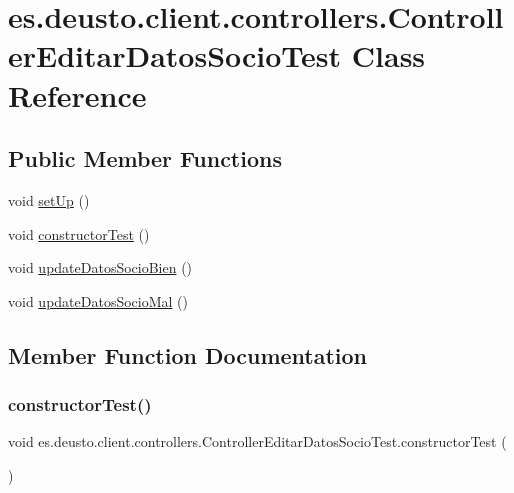 \hypertarget{classes_1_1deusto_1_1client_1_1controllers_1_1_controller_editar_datos_socio_test}{}\section{es.\+deusto.\+client.\+controllers.\+Controller\+Editar\+Datos\+Socio\+Test Class Reference}
\label{classes_1_1deusto_1_1client_1_1controllers_1_1_controller_editar_datos_socio_test}
\subsection*{Public Member Functions}
\begin{DoxyCompactItemize}
\item 
void \mbox{\hyperlink{classes_1_1deusto_1_1client_1_1controllers_1_1_controller_editar_datos_socio_test_ab7635a38ba9f432dc852984e9af15a46}{set\+Up}} ()
\item 
void \mbox{\hyperlink{classes_1_1deusto_1_1client_1_1controllers_1_1_controller_editar_datos_socio_test_a0249d77bf3cb7f5e685cd1b79ccf7596}{constructor\+Test}} ()
\item 
void \mbox{\hyperlink{classes_1_1deusto_1_1client_1_1controllers_1_1_controller_editar_datos_socio_test_a87ba84ae96cca2c56676ee5492425c84}{update\+Datos\+Socio\+Bien}} ()
\item 
void \mbox{\hyperlink{classes_1_1deusto_1_1client_1_1controllers_1_1_controller_editar_datos_socio_test_a9c2ab0b95bfbcc3c70a95118216789be}{update\+Datos\+Socio\+Mal}} ()
\end{DoxyCompactItemize}


\subsection{Member Function Documentation}
\mbox{\label{classes_1_1deusto_1_1client_1_1controllers_1_1_controller_editar_datos_socio_test_a0249d77bf3cb7f5e685cd1b79ccf7596}} 
\subsubsection{\texorpdfstring{constructorTest()}{constructorTest()}}
{\footnotesize\ttfamily void es.\+deusto.\+client.\+controllers.\+Controller\+Editar\+Datos\+Socio\+Test.\+constructor\+Test (\begin{DoxyParamCaption}{ }\end{DoxyParamCaption})}

